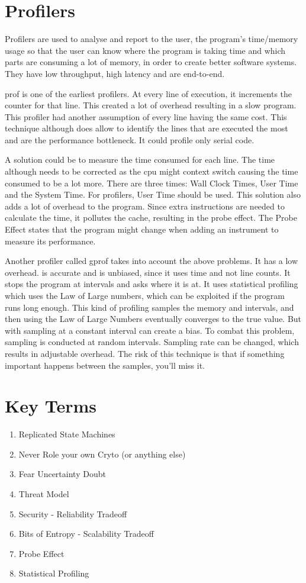 \documentclass[twoside]{article}
\begin{document}
\section{Profilers}

Profilers are used to analyse and report to the user, the program's time/memory usage so that the user can know where the program is taking time and which parts are consuming a lot of memory, in order to create better software systems. They have low throughput, high latency and are end-to-end.

prof is one of the earliest profilers. At every line of execution, it increments the counter for that line. This created a lot of overhead resulting in a slow program. This profiler had another assumption of every line having the same cost. This technique although does allow to identify the lines that are executed the most and are the performance bottleneck. It could profile only serial code.

A solution could be to measure the time consumed for each line. The time although needs to be corrected as the cpu might context switch causing the time consumed to be a lot more. There are three times: Wall Clock Times, User Time and the System Time. For profilers, User Time should be used. This solution also adds a lot of overhead to the program. Since extra instructions are needed to calculate the time, it pollutes the cache, resulting in the probe effect. The Probe Effect states that the program might change when adding an instrument to measure its performance. 

Another profiler called gprof takes into account the above problems. It has a low overhead. is accurate and is unbiased, since it uses time and not line counts. It stops the program at intervals and asks where it is at. It uses statistical profiling which uses the Law of Large numbers, which can be exploited if the program runs long enough. This kind of profiling samples the memory and intervals, and then using the Law of Large Numbers eventually converges to the true value. But with sampling at a constant interval can create a bias. To combat this problem, sampling is conducted at random intervals. Sampling rate can be changed, which results in adjustable overhead. The risk of this technique is that if something important happens between the samples, you'll miss it. 
\section{Key Terms}

\begin{enumerate}
    \item Replicated State Machines 
    \item Never Role your own Cryto (or anything else)
    \item Fear Uncertainty Doubt
    \item Threat Model
    \item Security - Reliability Tradeoff
    \item Bits of Entropy - Scalability Tradeoff
    \item Probe Effect
    \item Statistical Profiling
\end{enumerate}{}
\end{document}
